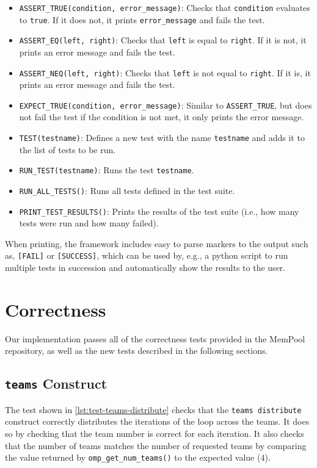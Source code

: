 \begin{itemize}
	\item \texttt{ASSERT_TRUE(condition, error_message)}: Checks that \texttt{condition} evaluates to
	      \texttt{true}. If it does not, it prints \texttt{error_message} and fails the test.
	\item \texttt{ASSERT_EQ(left, right)}: Checks that \texttt{left} is equal to \texttt{right}. If
	      it is not, it prints an error message and fails the test.
	\item \texttt{ASSERT_NEQ(left, right)}: Checks that \texttt{left} is not equal to \texttt{right}.
	      If it is, it prints an error message and fails the test.
	\item \texttt{EXPECT_TRUE(condition, error_message)}: Similar to \texttt{ASSERT_TRUE}, but does
	      not fail the test if the condition is not met, it only prints the error message.
	\item \texttt{TEST(testname)}: Defines a new test with the name \texttt{testname} and adds it to
	      the list of tests to be run.
	\item \texttt{RUN_TEST(testname)}: Runs the test \texttt{testname}.
	\item \texttt{RUN_ALL_TESTS()}: Runs all tests defined in the test suite.
	\item \texttt{PRINT_TEST_RESULTS()}: Prints the results of the test suite (i.e., how many tests
	      were run and how many failed).
\end{itemize}

When printing, the framework includes easy to parse markers to the output such as, \texttt{[FAIL]}
or \texttt{[SUCCESS]}, which can be used by, e.g., a python script to run multiple tests in
succession and automatically show the results to the user.

\section{Correctness}
\label{sec:correctness}

Our implementation passes all of the correctness tests provided in the MemPool repository, as well as
the new tests described in the following sections.

\subsection{\texttt{teams} Construct}

The test shown in \cref{lst:test-teams-distribute} checks that the \texttt{teams distribute}
construct correctly distributes the iterations of the loop across the teams. It does so by checking
that the team number is correct for each iteration. It also checks that the number of teams matches
the number of requested teams by comparing the value returned by \texttt{omp\_get\_num\_teams()} to
the expected value (4).

